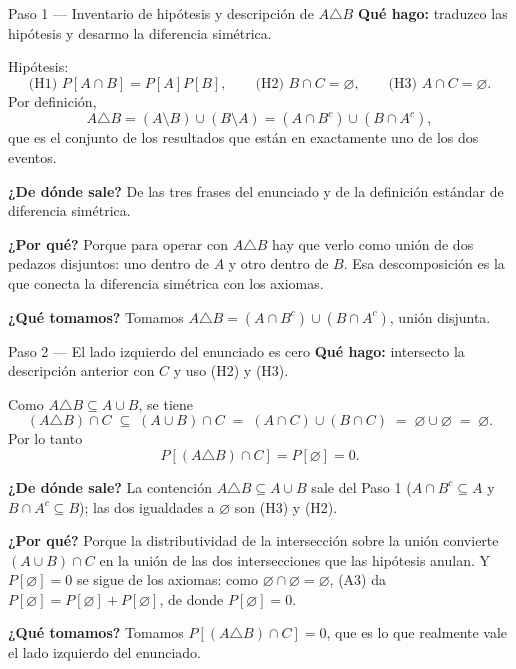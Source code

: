 \documentclass[11pt]{article}
\begin{document}
\begin{sol}

\begin{paso}{Paso 1 --- Inventario de hip\'otesis y descripci\'on de $A\triangle B$}
\textbf{Qu\'e hago:} traduzco las hip\'otesis y desarmo la diferencia sim\'etrica.

Hip\'otesis:
\[
\text{(H1) } P[A\cap B]=P[A]P[B],
\qquad
\text{(H2) } B\cap C=\varnothing,
\qquad
\text{(H3) } A\cap C=\varnothing .
\]
Por definici\'on,
\[
A\triangle B=(A\setminus B)\cup(B\setminus A)=(A\cap B^{c})\cup(B\cap A^{c}),
\]
que es el conjunto de los resultados que est\'an en exactamente uno de los dos eventos.

\textbf{¿De d\'onde sale?} De las tres frases del enunciado y de la definici\'on est\'andar de diferencia sim\'etrica.

\textbf{¿Por qu\'e?} Porque para operar con $A\triangle B$ hay que verlo como uni\'on de dos pedazos disjuntos: uno dentro de $A$ y otro dentro de $B$. Esa descomposici\'on es la que conecta la diferencia sim\'etrica con los axiomas.

\textbf{¿Qu\'e tomamos?} Tomamos $A\triangle B=(A\cap B^{c})\cup(B\cap A^{c})$, uni\'on disjunta.
\end{paso}

\begin{paso}{Paso 2 --- El lado izquierdo del enunciado es cero}
\textbf{Qu\'e hago:} intersecto la descripci\'on anterior con $C$ y uso (H2) y (H3).

Como $A\triangle B\subseteq A\cup B$, se tiene
\[
(A\triangle B)\cap C\;\subseteq\;(A\cup B)\cap C\;=\;(A\cap C)\cup(B\cap C)\;=\;\varnothing\cup\varnothing\;=\;\varnothing .
\]
Por lo tanto
\[
P[(A\triangle B)\cap C]=P[\varnothing]=0 .
\]

\textbf{¿De d\'onde sale?} La contenci\'on $A\triangle B\subseteq A\cup B$ sale del Paso 1 ($A\cap B^{c}\subseteq A$ y $B\cap A^{c}\subseteq B$); las dos igualdades a $\varnothing$ son (H3) y (H2).

\textbf{¿Por qu\'e?} Porque la distributividad de la intersecci\'on sobre la uni\'on convierte $(A\cup B)\cap C$ en la uni\'on de las dos intersecciones que las hip\'otesis anulan. Y $P[\varnothing]=0$ se sigue de los axiomas: como $\varnothing\cap\varnothing=\varnothing$, (A3) da $P[\varnothing]=P[\varnothing]+P[\varnothing]$, de donde $P[\varnothing]=0$.

\textbf{¿Qu\'e tomamos?} Tomamos $P[(A\triangle B)\cap C]=0$, que es lo que realmente vale el lado izquierdo del enunciado.
\end{paso}


\end{sol}
\end{document}

